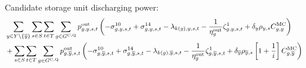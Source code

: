 \documentclass{article}
\begin{document}
Candidate storage unit discharging power:
\begin{align}
	& \sum\limits_{\iYear \in \sYears \setminus \{\iYearTerminal\}}\sum\limits_{\iScenario \in \sScenarios} \sum\limits_{\iInterval \in \sIntervals 
	} \sum\limits_{\iGenerator \in \sStorageCandidate} \vPowerOut \left( - \dNonNegativeDischarging + \dMaxDischargingRateCandidate - \dPowerBalance[k(\iGenerator),\iYear,\iScenario,\iInterval] - \frac{1}{\cStorageUnitEfficiencyDischarging} \dStorageEnergyTransition + \cDiscountRate \cScenarioDuration \cMarginalCost \right) \nonumber \\ 
	& + \sum\limits_{\iScenario \in \sScenarios}\sum\limits_{\iInterval \in \sIntervals 
} \sum\limits_{\iGenerator \in \sStorageCandidate} \vPowerOut[\iGenerator,\iYearTerminal,\iScenario,\iInterval] \left( - \dNonNegativeDischarging[\iGenerator,\iYearTerminal,\iScenario,\iInterval] + \dMaxDischargingRateCandidate[\iGenerator,\iYearTerminal,\iScenario,\iInterval] - \dPowerBalance[k(\iGenerator),\iYearTerminal,\iScenario,\iInterval] - \frac{1}{\cStorageUnitEfficiencyDischarging} \dStorageEnergyTransition[\iGenerator,\iYearTerminal,\iScenario,\iInterval] + \cDiscountRate[\iYearTerminal] \cScenarioDuration[\iYearTerminal,\iScenario] \left[1 + \frac{1}{\cInterestRate}\right] \cMarginalCost[\iGenerator,\iYearTerminal] \right) \nonumber\\
\end{align}
\end{document}
